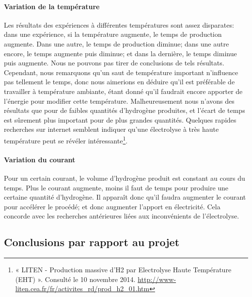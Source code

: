 \documentclass[10pt]{article}
\begin{document}
\paragraph{Variation de la température} Les résultats des expériences à différentes températures sont assez disparates:
dans une expérience, si la température augmente, le temps de production augmente. Dans une autre, le temps de production
diminue; dans une autre encore, le temps augmente puis diminue; et dans la dernière, le temps diminue puis augmente.
Nous ne pouvons pas tirer de conclusions de tels résultats. Cependant, nous remarquons qu'un saut de température important
n'influence pas tellement le temps, donc nous aimerions en déduire qu'il est préférable de travailler à température
ambiante, étant donné qu'il faudrait encore apporter de l'énergie pour modifier cette température. Malheureusement 
nous n'avons des résultats que pour de faibles quantités d'hydrogène produites, et l'écart de temps est sûrement plus 
important pour de plus grandes quantités. Quelques rapides recherches sur internet semblent indiquer qu'une électrolyse
à très haute température peut se révéler intéressante\footnote{« LITEN - Production massive d’H2 par Electrolyse 
Haute Température (EHT) ». Consulté le 10 novembre 2014. \url{http://www-liten.cea.fr/fr/activites_rd/prod_h2_01.htm}}.

\paragraph{Variation du courant} Pour un certain courant, le volume d'hydrogène produit est constant au cours du temps.
Plus le courant augmente, moins il faut de temps pour produire une certaine quantité d'hydrogène. Il apparaît donc 
qu'il faudra augmenter le courant pour accélérer le procédé; et donc augmenter l'apport en électricité. Cela concorde 
avec les recherches antérieures liées aux inconvénients de l'électrolyse.

\subsection*{Conclusions par rapport au projet}
\end{document}
